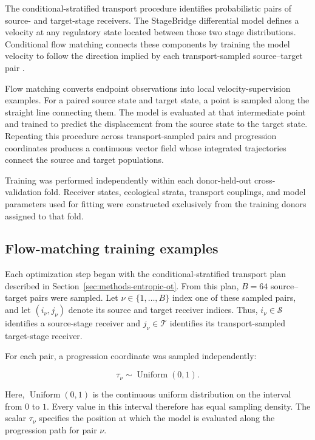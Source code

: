 The conditional-stratified transport procedure identifies probabilistic pairs
of source- and target-stage receivers. The StageBridge differential model
defines a velocity at any regulatory state located between those two stage
distributions. Conditional flow matching connects these components by training
the model velocity to follow the direction implied by each transport-sampled
source--target pair \autocite{Lipman2022-ns,Bunne2022-go}.

Flow matching converts endpoint observations into local velocity-supervision
examples. For a paired source state and target state, a point is sampled along
the straight line connecting them. The model is evaluated at that intermediate
point and trained to predict the displacement from the source state to the
target state. Repeating this procedure across transport-sampled pairs and
progression coordinates produces a continuous vector field whose integrated
trajectories connect the source and target populations.

Training was performed independently within each donor-held-out
cross-validation fold. Receiver states, ecological strata, transport
couplings, and model parameters used for fitting were constructed exclusively
from the training donors assigned to that fold.

\subsection{Flow-matching training examples}
\label{appb-sec:methods-cfm-paths}

Each optimization step began with the conditional-stratified transport plan
described in Section~\ref{sec:methods-entropic-ot}. From this plan,
\(B=64\) source--target pairs were sampled. Let
\(\nu\in\{1,\ldots,B\}\) index one of these sampled pairs, and let
\((i_\nu,j_\nu)\) denote its source and target receiver indices. Thus,
\(i_\nu\in\mathcal{S}\) identifies a source-stage receiver and
\(j_\nu\in\mathcal{T}\) identifies its transport-sampled target-stage
receiver.

For each pair, a progression coordinate was sampled independently:

\begin{equation}
\tau_\nu
\sim
\operatorname{Uniform}(0,1).
\label{appb-eq:methods-cfm-time-sampling}
\end{equation}

Here, \(\operatorname{Uniform}(0,1)\) is the continuous uniform distribution
on the interval from \(0\) to \(1\). Every value in this interval therefore
has equal sampling density. The scalar \(\tau_\nu\) specifies the position at
which the model is evaluated along the progression path for pair \(\nu\).

